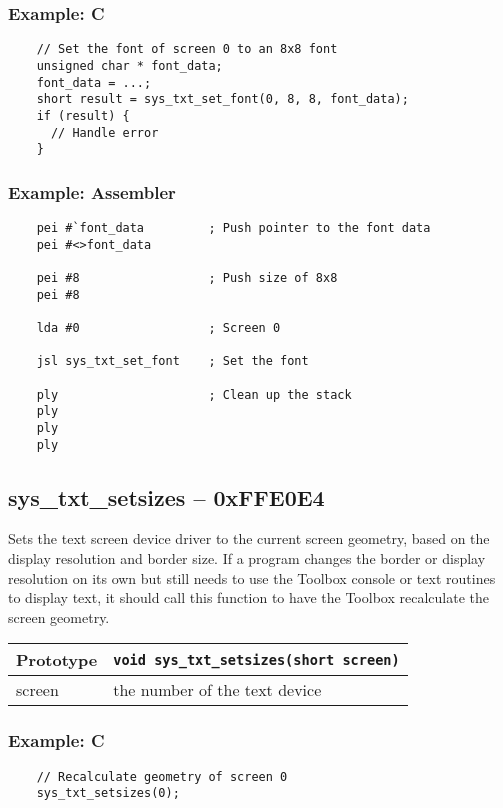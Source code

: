 \subsubsection*{Example: C}
\begin{lstlisting}
    // Set the font of screen 0 to an 8x8 font
    unsigned char * font_data;
    font_data = ...;
    short result = sys_txt_set_font(0, 8, 8, font_data);
    if (result) {
      // Handle error
    }    
\end{lstlisting}

\subsubsection*{Example: Assembler}
\begin{verbatim}
    pei #`font_data         ; Push pointer to the font data
    pei #<>font_data

    pei #8                  ; Push size of 8x8
    pei #8

    lda #0                  ; Screen 0

    jsl sys_txt_set_font    ; Set the font

    ply                     ; Clean up the stack
    ply
    ply
    ply
\end{verbatim}


\subsection*{sys\_txt\_setsizes -- 0xFFE0E4}
Sets the text screen device driver to the current screen geometry, based on the display resolution and border size. If a program changes the border or display resolution on its own but still needs to use the Toolbox console or text routines to display text, it should call this function to have the Toolbox recalculate the screen geometry.

\bigskip

\begin{tabular}{|l||l|} \hline
Prototype & \lstinline!void sys_txt_setsizes(short screen)! \\ \hline
screen & the number of the text device \\ \hline
\end{tabular}

\subsubsection*{Example: C}
\begin{lstlisting}
    // Recalculate geometry of screen 0
    sys_txt_setsizes(0);
\end{lstlisting}

